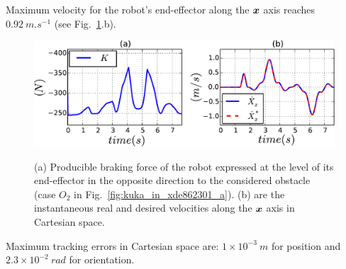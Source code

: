 \documentclass[letterpaper, 10 pt, conference]{ieeeconf}      %
\newcommand{\vect}[1]{\mbox{\boldmath${#1}$}}%
\begin{document}
Maximum velocity for the robot's end-effector along the $\vect{x}$ axis reaches $0.92~m.s^{-1}$ (see Fig.~\ref{fig:k_xdot}.b).
\begin{figure}[!htbp]
\centering
{\includegraphics[width=1\columnwidth]{figures/k_xdot}}
\caption{(a) Producible braking force of the robot expressed at the level of its end-effector in the opposite direction to the considered obstacle (case $O_2$ in Fig.~\ref{fig:kuka_in_xde862301_a}). (b) are the instantaneous real and desired velocities along the $\vect{x}$ axis in Cartesian space.} 
\label{fig:k_xdot}
\end{figure}
Maximum tracking errors in Cartesian space are: $1 \times 10^{-3}~m$ for position and $2.3 \times 10^{-2}~rad$ for orientation. 
\end{document}

